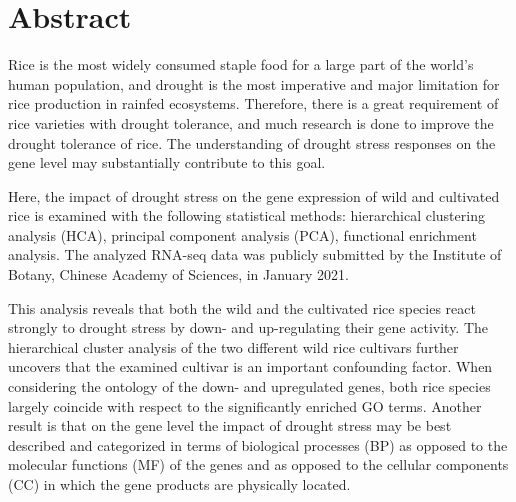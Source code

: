 \section{Abstract}

Rice is the most widely consumed staple food for a large part of the world's human population, and drought is the most imperative and major limitation for rice production in rainfed ecosystems. Therefore, there is a great requirement of rice varieties with drought tolerance, and much research is done to improve the drought tolerance of rice. The understanding of drought stress responses on the gene level may substantially contribute to this goal.

Here, the impact of drought stress on the gene expression of wild and cultivated rice is examined with the following statistical methods: hierarchical clustering analysis (HCA), principal component analysis (PCA), functional enrichment analysis. The analyzed RNA-seq data was publicly submitted by the Institute of Botany, Chinese Academy of Sciences, in January 2021.

This analysis reveals that both the wild and the cultivated rice species react strongly to drought stress by down- and up-regulating their gene activity. The hierarchical cluster analysis of the two different wild rice cultivars further uncovers that the examined cultivar is an important confounding factor. When considering the ontology of the down- and upregulated genes, both rice species largely coincide with respect to the significantly enriched GO terms. Another result is that on the gene level the impact of drought stress may be best described and categorized in terms of biological processes (BP) as opposed to the molecular functions (MF) of the genes and as opposed to the cellular components (CC) in which the gene products are physically located.